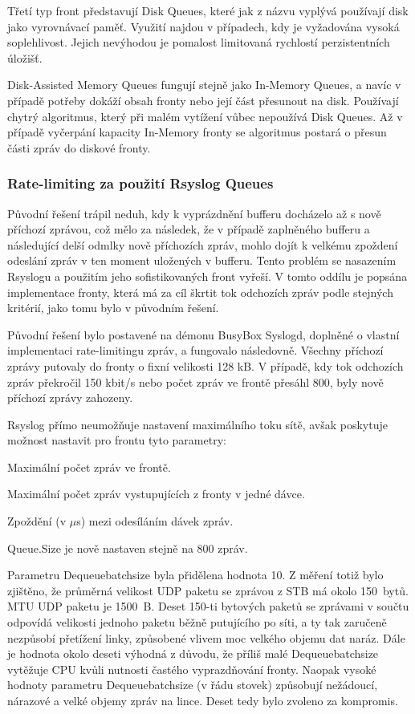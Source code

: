 \documentclass[thesis=B,czech]{FITthesis}[2012/06/26]
\begin{document}
Třetí typ front představují Disk Queues, které jak z názvu vyplývá používají disk jako vyrovnávací paměť. Využití najdou v případech, kdy je vyžadována vysoká soplehlivost. Jejich nevýhodou je pomalost limitovaná rychlostí perzistentních úložišť.

Disk-Assisted Memory Queues fungují stejně jako In-Memory Queues, a navíc v případě potřeby dokáží obsah fronty nebo její část přesunout na disk. Používají chytrý algoritmus, který při malém vytížení vůbec nepoužívá Disk Queues. Až v případě vyčerpání kapacity In-Memory fronty se algoritmus postará o přesun části zpráv do diskové fronty.

\subsubsection*{Rate-limiting za použití Rsyslog Queues}
Původní řešení trápil neduh, kdy k vyprázdnění bufferu docházelo až s nově příchozí zprávou, což mělo za následek, že v případě zaplněného bufferu a následující delší odmlky nově příchozích zpráv, mohlo dojít k velkému zpoždení odeslání zpráv v ten moment uložených v bufferu. Tento problém se nasazením Rsyslogu a použitím jeho sofistikovaných front vyřeší.
V tomto oddílu je popsána implementace fronty, která má za cíl škrtit tok odchozích zpráv podle stejných kritérií, jako tomu bylo v původním řešení.

Původní řešení bylo postavené na démonu BusyBox Syslogd, doplněné o vlastní implementaci rate-limitingu zpráv, a fungovalo následovně. Všechny příchozí zprávy putovaly do fronty o fixní velikosti 128 kB. V případě, kdy tok odchozích zpráv překročil 150 kbit/s nebo počet zpráv ve frontě přesáhl 800, byly nově příchozí zprávy zahozeny.

Rsyslog přímo neumožňuje nastavení maximálního toku sítě, avšak poskytuje možnost nastavit pro frontu tyto parametry:
\begin{description}
  \setlength\itemsep{-1ex}
  \item [Queue.Size:] Maximální počet zpráv ve frontě.
  \item [Queue.Dequeuebatchsize:] Maximální počet zpráv vystupujících z fronty v jedné dávce.
  \item [Queue.Dequeueslowdown:] Zpoždění (v $\mu$s) mezi odesíláním dávek zpráv.
\end{description}

Queue.Size je nově nastaven stejně na 800 zpráv.

Parametru Dequeuebatchsize byla přidělena hodnota 10. Z měření totiž bylo zjištěno, že průměrná velikost UDP paketu se zprávou z STB má okolo 150~bytů. MTU UDP paketu je 1500~B. Deset 150-ti bytových paketů se zprávami v součtu odpovídá velikosti jednoho paketu běžně putujícího po síti, a ty tak zaručeně nezpůsobí přetížení linky, způsobené vlivem moc velkého objemu dat naráz.
Dále je hodnota okolo deseti výhodná z důvodu, že příliš malé Dequeuebatchsize vytěžuje CPU kvůli nutnosti častého vyprazdňování fronty. Naopak vysoké hodnoty parametru Dequeuebatchsize (v řádu stovek) způsobují nežádoucí, nárazové a velké objemy zpráv na lince. Deset tedy bylo zvoleno za kompromis.
  
\end{document}
